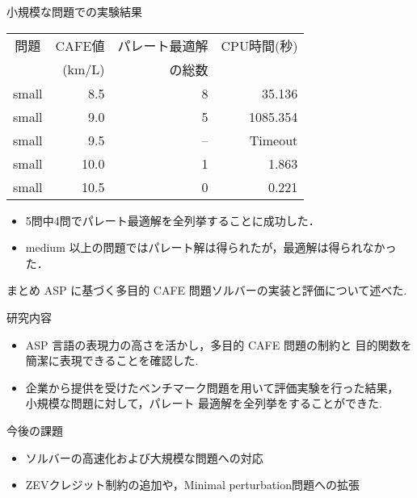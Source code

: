 \documentclass[dvipdfmx, 11pt]{beamer}
\begin{document}
\begin{frame}{小規模な問題での実験結果}
 \begin{exampleblock}{}
  \centering
  \begin{tabular}{c|r|rr}
   問題   & CAFE値  & パレート最適解 & CPU時間(秒) \\
          & (km/L)  & の総数  &  \\ \hline
   small  & 8.5   & 8             & 35.136     \\
   small  & 9.0   & 5             & 1085.354   \\
   small  & 9.5   & --            & Timeout    \\
   small  & 10.0  & 1             & 1.863      \\
   small  & 10.5  & 0             & 0.221      \\ 
  \end{tabular}
 \end{exampleblock}
 \begin{itemize}
  \item 5問中4問でパレート最適解を全列挙することに成功した．
  \item medium 以上の問題ではパレート解は得られたが，最適解は得られなかった．
 \end{itemize}
\end{frame}
\begin{frame}{まとめ}
 ASP に基づく多目的 CAFE 問題ソルバーの実装と評価について述べた.   
 \begin{block}{研究内容}
 \begin{itemize}
  \item ASP 言語の表現力の高さを活かし，多目的 CAFE 問題の制約と
	目的関数を簡潔に表現できることを確認した.
  \item 企業から提供を受けたベンチマーク問題を用いて評価実験を行った結果，
	小規模な問題に対して，パレート 最適解を全列挙をすることができた.
 \end{itemize}
 \end{block}

 \begin{exampleblock}{今後の課題}
  \begin{itemize}
   \item ソルバーの高速化および大規模な問題への対応
   \item ZEVクレジット制約の追加や，Minimal perturbation問題への拡張
  \end{itemize}
 \end{exampleblock}
\end{frame}
\end{document}
